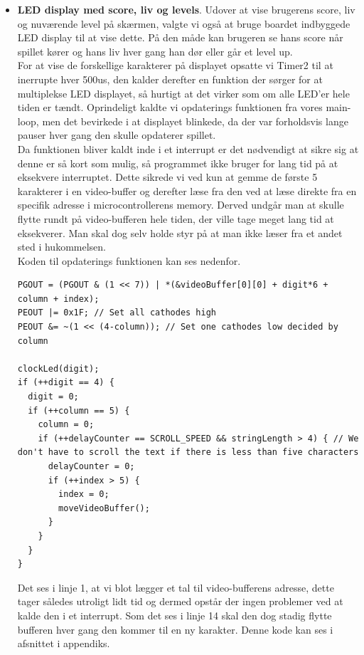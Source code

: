 \begin{itemize}
\item \textbf{LED display med score, liv og levels}. Udover at vise brugerens score, liv og nuværende level på skærmen, valgte vi også at bruge boardet indbyggede LED display til at vise dette. På den måde kan brugeren se hans score når spillet kører og hans liv hver gang han dør eller går et level up. \\
For at vise de forskellige karakterer på displayet opsatte vi Timer2 til at inerrupte hver 500us, den kalder derefter en funktion der sørger for at  multiplekse LED displayet, så hurtigt at det virker som om alle LED'er hele tiden er tændt. Oprindeligt kaldte vi opdaterings funktionen fra vores main-loop, men det bevirkede i at displayet blinkede, da der var forholdsvis lange pauser hver gang den skulle opdaterer spillet. \\
Da funktionen bliver kaldt inde i et interrupt er det nødvendigt at sikre sig at denne er så kort som mulig, så programmet ikke bruger for lang tid på at eksekvere interruptet. Dette sikrede vi ved kun at gemme de første 5 karakterer i en video-buffer og derefter læse fra den ved at læse direkte fra en specifik adresse i microcontrollerens memory. Derved undgår man at skulle flytte rundt på video-bufferen hele tiden, der ville tage meget lang tid at eksekverer. Man skal dog selv holde styr på at man ikke læser fra et andet sted i hukommelsen. \\
Koden til opdaterings funktionen kan ses nedenfor.

\begin{lstlisting}[frame=single]
PGOUT = (PGOUT & (1 << 7)) | *(&videoBuffer[0][0] + digit*6 + column + index);
PEOUT |= 0x1F; // Set all cathodes high
PEOUT &= ~(1 << (4-column)); // Set one cathodes low decided by column

clockLed(digit);
if (++digit == 4) {
  digit = 0;
  if (++column == 5) {
    column = 0;
	if (++delayCounter == SCROLL_SPEED && stringLength > 4) { // We don't have to scroll the text if there is less than five characters
	  delayCounter = 0;				
	  if (++index > 5) {
        index = 0;
		moveVideoBuffer();
	  }
	}
  }
}
\end{lstlisting}

Det ses i linje 1, at vi blot lægger et tal til video-bufferens adresse, dette tager således utroligt lidt tid og dermed opstår der ingen problemer ved at kalde den i et interrupt. Som det ses i linje 14 skal den dog stadig flytte bufferen hver gang den kommer til en ny karakter. Denne kode kan ses i afsnittet  i appendiks.


\end{itemize}

